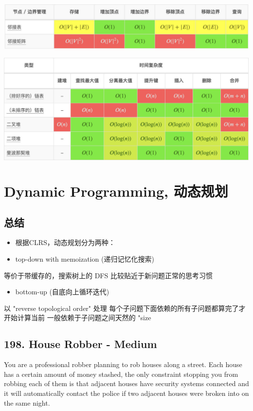 \documentclass[9pt, b5paaper]{book}
\begin{document}
\includegraphics[width=.9\linewidth]{./pic/bigo4.jpeg}

\includegraphics[width=.9\linewidth]{./pic/bigo5.jpeg}

\chapter{Dynamic Programming, 动态规划}
\label{sec-2}
\section{总结}
\label{sec-2-1}
\begin{itemize}
\item 根据CLRS，动态规划分为两种：
\item top-down with memoization (递归记忆化搜索)
\end{itemize}
等价于带缓存的，搜索树上的 DFS
比较贴近于新问题正常的思考习惯
\begin{itemize}
\item bottom-up (自底向上循环迭代)
\end{itemize}
以 "reverse topological order" 处理
每个子问题下面依赖的所有子问题都算完了才开始计算当前
一般依赖于子问题之间天然的 "size

\section{198. House Robber - Medium}
\label{sec-2-2}
You are a professional robber planning to rob houses along a street. Each house has a certain amount of money stashed, the only constraint stopping you from robbing each of them is that adjacent houses have security systems connected and it will automatically contact the police if two adjacent houses were broken into on the same night.
\end{document}
